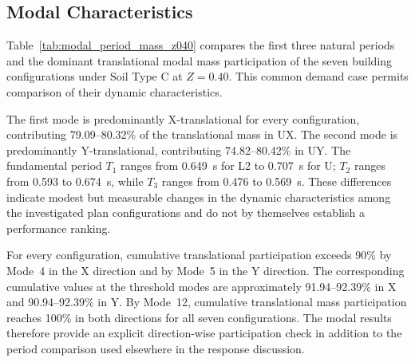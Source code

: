 \subsection{Modal Characteristics}
Table~\ref{tab:modal_period_mass_z040} compares the first three natural periods and the dominant translational modal mass participation of the seven building configurations under Soil Type C at $Z=0.40$. This common demand case permits comparison of their dynamic characteristics.



The first mode is predominantly X-translational for every configuration, contributing 79.09--80.32\% of the translational mass in UX. The second mode is predominantly Y-translational, contributing 74.82--80.42\% in UY. The fundamental period $T_1$ ranges from 0.649~s for L2 to 0.707~s for U; $T_2$ ranges from 0.593 to 0.674~s, while $T_3$ ranges from 0.476 to 0.569~s. These differences indicate modest but measurable changes in the dynamic characteristics among the investigated plan configurations and do not by themselves establish a performance ranking.



For every configuration, cumulative translational participation exceeds 90\% by Mode~4 in the X direction and by Mode~5 in the Y direction. The corresponding cumulative values at the threshold modes are approximately 91.94--92.39\% in X and 90.94--92.39\% in Y. By Mode~12, cumulative translational mass participation reaches 100\% in both directions for all seven configurations. The modal results therefore provide an explicit direction-wise participation check in addition to the period comparison used elsewhere in the response discussion.
\FloatBarrier
